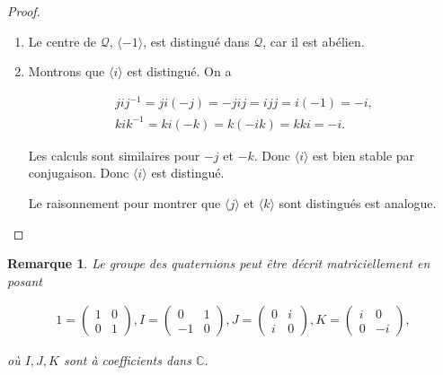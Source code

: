 \documentclass[french]{report}
\newtheorem*{remark}{Remarque}
\begin{document}
\begin{proof}
  \

\begin{enumerate}
  \item Le centre de $\mathcal{Q}$, $\langle -1 \rangle $, est distingué dans $\mathcal{Q}$, car il est abélien.
  \item Montrons que $\langle i  \rangle $ est distingué. On a

  \begin{gather*}
    j i j ^{-1}  = j i (-j) = -jij = ijj = i (-1) = -i , \\
    k i k ^{-1} = k i (-k) = k(-ik) = kki=-i.
  \end{gather*}

  Les calculs sont similaires pour $-j$ et $-k$. Donc $\langle i \rangle $ est bien stable par conjugaison. Donc $\langle i \rangle $ est distingué.

  Le raisonnement pour montrer que $\langle j \rangle $ et $\langle k \rangle $ sont distingués est analogue.
\end{enumerate}
\end{proof}

\begin{remark}
Le groupe des quaternions peut être décrit matriciellement en posant

\begin{gather*}
  1 = \begin{pmatrix}
  1 & 0 \\
  0 & 1
\end{pmatrix}, I = \begin{pmatrix}
  0 & 1 \\
  -1 & 0
\end{pmatrix}, J = \begin{pmatrix}
  0 & i \\
  i & 0
\end{pmatrix}, K = \begin{pmatrix}
  i & 0 \\
  0 & -i
\end{pmatrix},
\end{gather*}

où $I,J,K$ sont à coefficients dans $\mathbb{C}$.
\end{remark}





\end{document}
